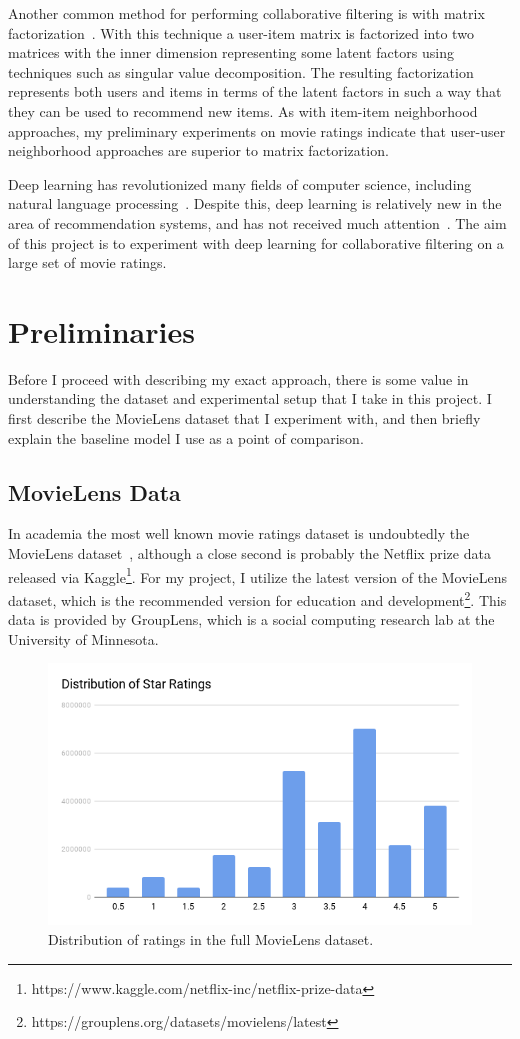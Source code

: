 \documentclass[12pt]{article}
\begin{document}
Another common method for performing collaborative filtering is with matrix
factorization~\cite{matrix-factorization}.
With this technique a user-item matrix is factorized into two matrices with the
inner dimension representing some latent factors using techniques such as
singular value decomposition.
The resulting factorization represents both users and items in terms of the
latent factors in such a way that they can be used to recommend new items.
As with item-item neighborhood approaches, my preliminary experiments on movie
ratings indicate that user-user neighborhood approaches are superior to matrix
factorization.

Deep learning has revolutionized many fields of computer science, including
natural language processing~\cite{deep-survey}.
Despite this, deep learning is relatively new in the area of recommendation
systems, and has not received much attention~\cite{dl-recsys-survey}.
The aim of this project is to experiment with deep learning for collaborative
filtering on a large set of movie ratings.

\section{Preliminaries}

Before I proceed with describing my exact approach, there is some value in
understanding the dataset and experimental setup that I take in this project.
I first describe the MovieLens dataset that I experiment with, and then
briefly explain the baseline model I use as a point of comparison.

\subsection{MovieLens Data}

In academia the most well known movie ratings dataset is undoubtedly the
MovieLens dataset~\cite{movielens},
although a close second is probably the Netflix prize data released via
Kaggle\footnote{https://www.kaggle.com/netflix-inc/netflix-prize-data}.
For my project, I utilize the latest version of the MovieLens
dataset, which is the recommended version for education and
development\footnote{https://grouplens.org/datasets/movielens/latest}.
This data is provided by GroupLens, which is a social computing research lab
at the University of Minnesota.

\begin{figure}
\centering
\includegraphics[width=.5\textwidth]{stars}
\caption{Distribution of ratings in the full MovieLens dataset.}
\label{fig:stars}
\end{figure}
\end{document}
